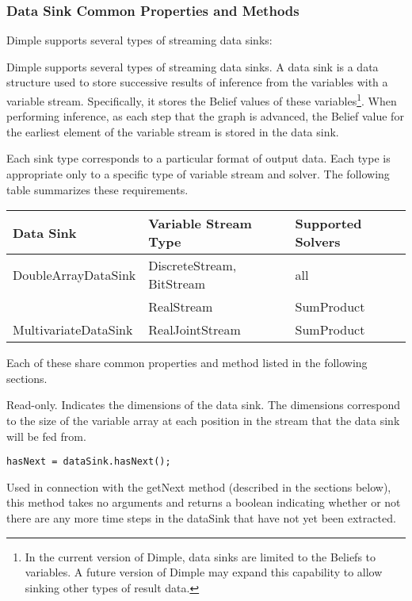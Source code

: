 \subsubsection{Data Sink Common Properties and Methods}
\label{sec:DataSink}

Dimple supports several types of streaming data sinks:

Dimple supports several types of streaming data sinks.  A data sink is a data structure used to store successive results of inference from the variables with a variable stream.  Specifically, it stores the Belief values of these variables\footnote{In the current version of Dimple, data sinks are limited to the Beliefs to variables.  A future version of Dimple may expand this capability to allow sinking other types of result data.}.  When performing inference, as each step that the graph is advanced, the Belief value for the earliest element of the variable stream is stored in the data sink.

Each sink type corresponds to a particular format of output data.  Each type is appropriate only to a specific type of variable stream and solver.  The following table summarizes these requirements.

\begin{longtable} {l | l | l}
Data Sink & Variable Stream Type & Supported Solvers \\
\hline
\endhead
DoubleArrayDataSink & DiscreteStream, BitStream & all \\
 & RealStream & SumProduct \\
MultivariateDataSink & RealJointStream & SumProduct \\
\end{longtable} 

Each of these share common properties and method listed in the following sections.



Read-only.  Indicates the dimensions of the data sink.  The dimensions correspond to the size of the variable array at each position in the stream that the data sink will be fed from.



\begin{lstlisting}
hasNext = dataSink.hasNext();
\end{lstlisting}

Used in connection with the getNext method (described in the sections below), this method takes no arguments and returns a boolean indicating whether or not there are any more time steps in the dataSink that have not yet been extracted.



